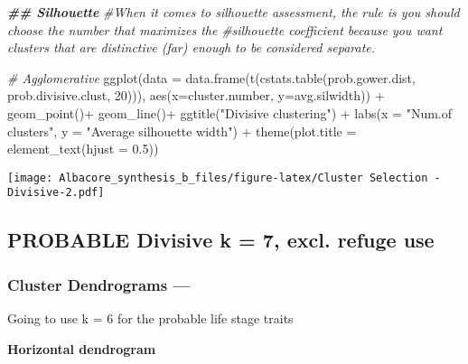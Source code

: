 \documentclass[
]{article}
\newenvironment{Shaded}{\begin{snugshade}}{\end{snugshade}}
\newcommand{\AttributeTok}[1]{\textcolor[rgb]{0.77,0.63,0.00}{#1}}
\newcommand{\CommentTok}[1]{\textcolor[rgb]{0.56,0.35,0.01}{\textit{#1}}}
\newcommand{\DecValTok}[1]{\textcolor[rgb]{0.00,0.00,0.81}{#1}}
\newcommand{\DocumentationTok}[1]{\textcolor[rgb]{0.56,0.35,0.01}{\textbf{\textit{#1}}}}
\newcommand{\FloatTok}[1]{\textcolor[rgb]{0.00,0.00,0.81}{#1}}
\newcommand{\FunctionTok}[1]{\textcolor[rgb]{0.00,0.00,0.00}{#1}}
\newcommand{\NormalTok}[1]{#1}
\newcommand{\SpecialCharTok}[1]{\textcolor[rgb]{0.00,0.00,0.00}{#1}}
\newcommand{\StringTok}[1]{\textcolor[rgb]{0.31,0.60,0.02}{#1}}
\begin{document}
\begin{Shaded}
\begin{Highlighting}[]
\DocumentationTok{\#\# Silhouette}
\CommentTok{\#When it comes to silhouette assessment, the rule is you should choose the number that maximizes the }
\CommentTok{\#silhouette coefficient because you want clusters that are distinctive (far) enough to be considered separate.}

\CommentTok{\# Agglomerative}
\FunctionTok{ggplot}\NormalTok{(}\AttributeTok{data =} \FunctionTok{data.frame}\NormalTok{(}\FunctionTok{t}\NormalTok{(}\FunctionTok{cstats.table}\NormalTok{(prob.gower.dist, prob.divisive.clust, }\DecValTok{20}\NormalTok{))), }
       \FunctionTok{aes}\NormalTok{(}\AttributeTok{x=}\NormalTok{cluster.number, }\AttributeTok{y=}\NormalTok{avg.silwidth)) }\SpecialCharTok{+} 
  \FunctionTok{geom\_point}\NormalTok{()}\SpecialCharTok{+}
  \FunctionTok{geom\_line}\NormalTok{()}\SpecialCharTok{+}
  \FunctionTok{ggtitle}\NormalTok{(}\StringTok{"Divisive clustering"}\NormalTok{) }\SpecialCharTok{+}
  \FunctionTok{labs}\NormalTok{(}\AttributeTok{x =} \StringTok{"Num.of clusters"}\NormalTok{, }\AttributeTok{y =} \StringTok{"Average silhouette width"}\NormalTok{) }\SpecialCharTok{+}
  \FunctionTok{theme}\NormalTok{(}\AttributeTok{plot.title =} \FunctionTok{element\_text}\NormalTok{(}\AttributeTok{hjust =} \FloatTok{0.5}\NormalTok{))}
\end{Highlighting}
\end{Shaded}

\texttt{[image: Albacore\_synthesis\_b\_files/figure-latex/Cluster Selection - Divisive-2.pdf]}

\hypertarget{probable-divisive-k-7-excl.-refuge-use}{%
\subsection{PROBABLE Divisive k = 7, excl. refuge
use}\label{probable-divisive-k-7-excl.-refuge-use}}

\hypertarget{cluster-dendrograms}{%
\subsubsection{Cluster Dendrograms ---}\label{cluster-dendrograms}}

Going to use k = 6 for the probable life stage traits

\textbf{Horizontal dendrogram}
\end{document}
